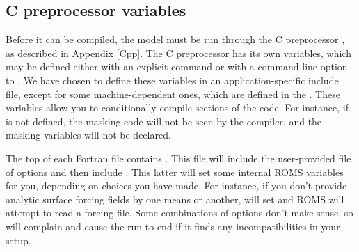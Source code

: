 \subsection{C preprocessor variables}
\label{Cpp1}
Before it can be compiled, the model must be run through the C
preprocessor , as described in Appendix \ref{Cpp}. The C
preprocessor has its own variables, which may be defined either with an
explicit  command or with a command line option to
. We have chosen to define these variables in an
application-specific include file, except for some
machine-dependent ones, which are defined in the .
These variables allow you to conditionally compile sections of the
code. For instance, if  is not defined, the masking
code will not be seen by the compiler, and the masking variables will
not be declared.

The top of each Fortran file contains .
This file will include the user-provided file of  options
and then include . This latter will set some
internal ROMS  variables for you, depending on choices you
have made. For instance, if you don't provide analytic surface
forcing fields by one means or another,  will set
 and ROMS will attempt to read a
forcing file. Some combinations of options don't make sense, so
 will complain and cause the run to end if it finds 
any incompatibilities in your setup.

